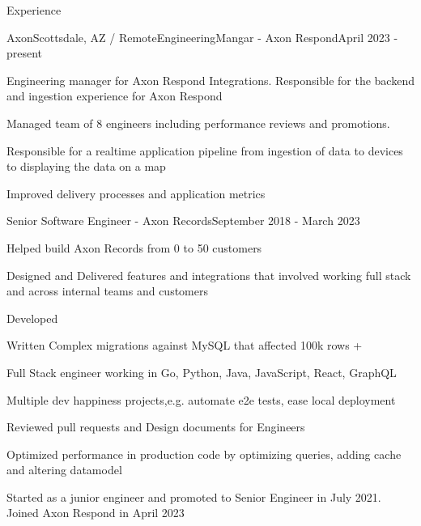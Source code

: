 \documentclass{resume} %
\begin{document}
\begin{rSection}{Experience}

\begin{rSubsection}{Axon}{Scottsdale, AZ / Remote}{EngineeringMangar - Axon Respond}{April 2023 - present}
\item Engineering manager for Axon Respond Integrations. Responsible for the backend and ingestion experience for Axon Respond
\item Managed team of 8 engineers including performance reviews and promotions.
\item Responsible for a realtime application pipeline from ingestion of data to devices to displaying the data on a map
\item Improved delivery processes and application metrics

\end{rSubsection}

\begin{rSubsection}{}{}{Senior Software Engineer - Axon Records}{September 2018 - March 2023}
\item Helped build Axon Records from 0 to 50 customers
\item Designed and Delivered features and integrations that involved working full stack and across internal teams and customers
\item Developed 
\item Written Complex migrations against MySQL that affected 100k rows + 
\item Full Stack engineer working in Go, Python, Java, JavaScript, React, GraphQL
\item Multiple dev happiness projects,e.g. automate e2e tests, ease local deployment
\item Reviewed pull requests and Design documents for Engineers
\item Optimized performance in production code by optimizing queries, adding cache and altering datamodel
\item Started as a junior engineer and promoted to Senior Engineer in July 2021. Joined Axon Respond in April 2023

\end{rSubsection}


\end{rSection}
\end{document}
